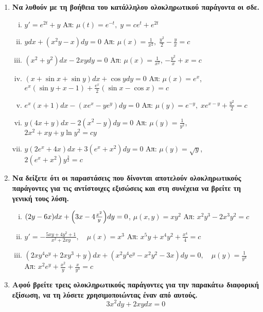 \begin{enumerate}
  \item {\bfseries Να λυθούν με τη βοήθεια του κατάλληλου ολοκληρωτικού 
    παράγοντα οι σδε.}
    \begin{enumerate}[i)]
      \item $ y' = e^{2t}+y $ \hfill Απ: $ \mu (t) = e^{-t}, \; y=ce^{t}+e^{2t} $ 
      \item $ ydx+(x^{2}y-x)dy=0 $ \hfill Απ: $ \mu (x) = \frac{1}{x^{2}}, \;
        \frac{y^{2}}{2} - \frac{y}{x} = c $ 
      \item $ (x^{2}+y^{2})dx - 2xydy = 0 $ 
        \hfill Απ: $\mu(x)= \frac{1}{x^{2}}$, $ - \frac{y^{2}}{x} + x = c $
      \item $ (x + \sin{x} + \sin{y})dx + \cos{y} dy =0 $ 
        \hfill Απ: $\mu(x)=e^{x} $, $ e^x(\sin{y} + x-1) + \frac{e^{x}}{2} 
        (\sin{x} - \cos{x})=c $
      \item $ e^{x}(x+1)dx - (xe^{x}-ye^{y})dy = 0 $
        \hfill Απ: $\mu(y) = e^{-y}, \; xe^{x-y} + \frac{y^{2}}{2} = c $
      \item $ y(4x+y)dx-2(x^{2}-y)dy=0 $ 
        \hfill Απ: $ \mu(y)= \frac{1}{y^{2}} $, $ 2x^{2}+xy+ y \ln{y^{2}} =cy$ 
      \item $ y(2e^{x}+4x)dx + 3(e^{x}+x^{2})dy = 0 $ 
        \hfill Απ: $ \mu(y)= \sqrt{ y } $, $ 2(e^{x}+x^{2})y^{\frac{3}{2}}=c $ 
    \end{enumerate}

  \item{\bfseries Να δείξετε ότι οι παραστάσεις που δίνονται αποτελούν ολοκληρωτικούς 
      παράγοντες για τις αντίστοιχες εξισώσεις και στη συνέχεια να βρείτε τη γενική 
    τους λύση.}
    \begin{enumerate}[i)]
      \item $ (2y-6x)dx+\Bigl(3x-4\frac{x^{2}}{y}\Bigr)dy=0 $, \; $ \mu (x,y) = xy^{2} $
        \hfill Απ: $ x^{2}y^{3}-2x^{3}y^{2}=c $ %
      \item $ y' =- \frac{5xy+4y^{2}+1}{x^{2}+2xy}, \quad \mu(x)=x^{3} $  
        \hfill Απ: $ x^{5}y+x^{4}y^{2} + \frac{x^{4}}{4} = c $ 
      \item $ (2xy^{4} \mathrm{e}^{y} + 2xy^{3}+y)dx + (x^{2}y^{4}\mathrm{e}^{y} -
        x^{2}y^{2}-3x)dy=0, \quad \mu (y) = \frac{1}{y^{4}} $ 
        \hfill Απ: $ x^{2}e^{y}+ \frac{x^{2}}{y} + \frac{x}{y^{3}} =c $ 
    \end{enumerate}

  \item {\bfseries Αφού βρείτε τρεις ολοκληρωτικούς παράγοντες για την 
    παρακάτω διαφορική εξίσωση, να τη λύσετε χρησιμοποιώντας έναν από αυτούς.}
    \[
      3x^{2}dy+2xydx=0 
    \] 


\end{enumerate}
